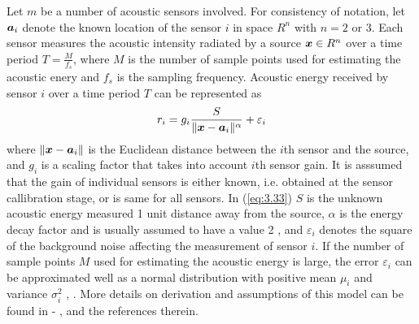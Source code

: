 Let $m$ be a number of acoustic sensors involved. For consistency of notation, let $\mbox{\boldmath$a$}_i$ denote the known location of the sensor $i$ in space $R^n$ with $n = 2$ or $3$. Each sensor measures the acoustic intensity radiated by a source $\mbox{\boldmath$x$}\in R^n$ over a time period $T = \frac{M}{f_s}$, where $M$ is the number of sample points used for estimating the acoustic enery and $f_s$ is the sampling frequency. %
 Acoustic energy received by sensor $i$ over a time period $T$ can be represented as
\begin{equation} \label{eq:3.33}
r_i = g_i \frac{S}{\|\mbox{\boldmath$x$} - \mbox{\boldmath$a$}_i\|^\alpha} + \varepsilon_i
\end{equation}
where $\|\mbox{\boldmath$x$} - \mbox{\boldmath$a$}_i\|$ is the Euclidean distance between the $i$th sensor and the source, and $g_i$ is a scaling factor that takes into account $i$th sensor gain. It is asssumed that the gain of individual sensors is either known, i.e. obtained at the sensor callibration stage, or is same for all sensors. In (\ref{eq:3.33}) $S$ is the unknown acoustic energy measured 1 unit distance away from the source, $\alpha$ is the energy decay factor %
and is usually assumed to have a value 2 \cite{LiHu}, and $\varepsilon_i$ denotes the square of the background noise affecting the measurement of sensor $i$. If the number of sample points $M$ used for estimating the acoustic energy  is large, the error $\varepsilon_i$ can be approximated well as a normal distribution with positive mean $\mu_i$ and variance $\sigma_i^2$ %
\cite{LiHu}, \cite{ShengHu}. More details on derivation and assumptions of this model can be found in %
\cite{LiHu} - \cite{LiuHuPan}, \cite{Saric} and the references therein. %


